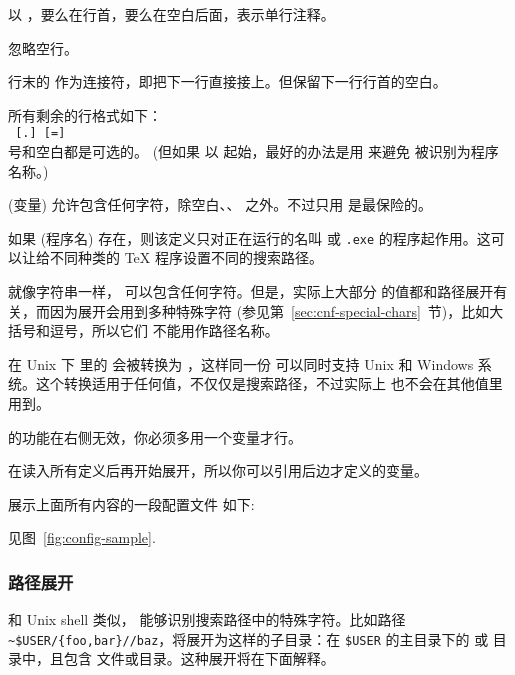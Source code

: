 \documentclass{article}
\begin{document}
\begin{itemize*}
\item
  以 \code{\%}，要么在行首，要么在空白后面，表示单行注释。
\item
  忽略空行。
\item
  行末的 \bs{} 作为连接符，即把下一行直接接上。但保留下一行行首的空白。
\item
  所有剩余的行格式如下：\\
  \hspace*{2em}\texttt{ \textrm{[}.\textrm{]}
  \textrm{[}=\textrm{]} }\\[1pt]
  \samp{=} 号和空白都是可选的。
  (但如果  以  起始，最好的办法是用 \samp{=} 来避免 
  被识别为程序名称。)
\item
   (变量) 允许包含任何字符，除空白、\samp{=}、
  之外。不过只用  是最保险的。
\item
  如果  (程序名) 存在，则该定义只对正在运行的名叫
  \texttt{} 或 \texttt{.exe}
  的程序起作用。这可以让给不同种类的 \TeX{} 程序设置不同的搜索路径。
\item 就像字符串一样， 可以包含任何字符。但是，实际上大部分
   的值都和路径展开有关，而因为展开会用到多种特殊字符
  (参见第~\ref{sec:cnf-special-chars}~节)，比如大括号和逗号，所以它们
  不能用作路径名称。

  在 Unix 下  里的 \samp{;} 会被转换为 \samp{:}，这样同一份
   可以同时支持 Unix 和 Windows
  系统。这个转换适用于任何值，不仅仅是搜索路径，不过实际上 \samp{;}
  也不会在其他值里用到。

   的功能在右侧无效，你必须多用一个变量才行。
\item
  在读入所有定义后再开始展开，所以你可以引用后边才定义的变量。
\end{itemize*}
展示上面所有内容的一段配置文件
\ifSingleColumn
如下:


\else
见图~\ref{fig:config-sample}.
\fi

\subsubsection{路径展开}
\label{sec:path-expansion}

和 Unix shell 类似，\KPS{} 能够识别搜索路径中的特殊字符。比如路径
\verb+~$USER/{foo,bar}//baz+，将展开为这样的子目录：在 \texttt{\$USER}
的主目录下的  或  目录中，且包含 
文件或目录。这种展开将在下面解释。
\end{document}
